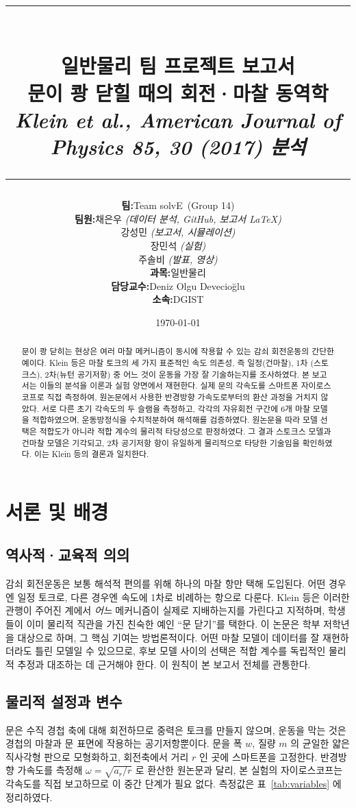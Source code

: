 \documentclass[11pt,letterpaper]{article}
\title{\vspace{-1.5in}
\rule{\linewidth}{1.5pt} \\ \vspace{4mm}
\large\textbf{일반물리 팀 프로젝트 보고서} \\ \vspace{2mm}
\Large\textbf{문이 쾅 닫힐 때의 회전·마찰 동역학}
\\ \vspace{4mm}
\large\textit{Klein et al., American Journal of Physics 85, 30 (2017) 분석} \\
\rule{\linewidth}{1.5pt}}
\author{
\begin{tabular}{r @{\quad} l}
\textbf{팀:} & Team solvE \,(Group 14) \\[1ex]
\textbf{팀원:} & 채은우 \textit{(데이터 분석, GitHub, 보고서 \LaTeX)} \\
 & 강성민 \textit{(보고서, 시뮬레이션)} \\
 & 장민석 \textit{(실험)} \\
 & 주솔비 \textit{(발표, 영상)} \\[1ex]
\textbf{과목:}  & 일반물리 \\
\textbf{담당교수:}    & Deniz Olgu Devecio\u{g}lu \\
\textbf{소속:}    & DGIST
\end{tabular}}
\date{\today}
\begin{document}
\maketitle
\begin{abstract}
문이 쾅 닫히는 현상은 여러 마찰 메커니즘이 동시에 작용할 수 있는 감쇠 회전운동의 간단한
예이다. Klein 등은 마찰 토크의 세 가지 표준적인 속도 의존성, 즉 일정(건마찰), 1차
(스토크스), 2차(뉴턴 공기저항) 중 어느 것이 운동을 가장 잘 기술하는지를 조사하였다. 본
보고서는 이들의 분석을 이론과 실험 양면에서 재현한다. 실제 문의 각속도를 스마트폰
자이로스코프로 직접 측정하여, 원논문에서 사용한 반경방향 가속도로부터의 환산 과정을 거치지
않았다. 서로 다른 초기 각속도의 두 슬램을 측정하고, 각각의 자유회전 구간에 6개 마찰 모델을
적합하였으며, 운동방정식을 수치적분하여 해석해를 검증하였다. 원논문을 따라 모델 선택은
적합도가 아니라 적합 계수의 물리적 타당성으로 판정하였다. 그 결과 스토크스 모델과 건마찰
모델은 기각되고, 2차 공기저항 항이 유일하게 물리적으로 타당한 기술임을 확인하였다. 이는
Klein 등의 결론과 일치한다.
\end{abstract}
\newpage
\tableofcontents
\newpage

\section{서론 및 배경}
\subsection{역사적·교육적 의의}
감쇠 회전운동은 보통 해석적 편의를 위해 하나의 마찰 항만 택해 도입된다. 어떤 경우엔 일정
토크로, 다른 경우엔 속도에 1차로 비례하는 항으로 다룬다. Klein 등은 이러한 관행이 주어진
계에서 \emph{어느} 메커니즘이 실제로 지배하는지를 가린다고 지적하며, 학생들이 이미 물리적
직관을 가진 친숙한 예인 ``문 닫기''를 택한다. 이 논문은 학부 저학년을 대상으로 하며, 그
핵심 기여는 방법론적이다. 어떤 마찰 모델이 데이터를 잘 재현하더라도 틀린 모델일 수 있으므로,
후보 모델 사이의 선택은 적합 계수를 독립적인 물리적 추정과 대조하는 데 근거해야 한다. 이
원칙이 본 보고서 전체를 관통한다.

\subsection{물리적 설정과 변수}
문은 수직 경첩 축에 대해 회전하므로 중력은 토크를 만들지 않으며, 운동을 막는 것은 경첩의
마찰과 문 표면에 작용하는 공기저항뿐이다. 문을 폭 $w$, 질량 $m$ 의 균일한 얇은 직사각형
판으로 모형화하고, 회전축에서 거리 $r$ 인 곳에 스마트폰을 고정한다. 반경방향 가속도를
측정해 $\omega=\sqrt{a_r/r}$ 로 환산한 원논문과 달리, 본 실험의 자이로스코프는 각속도를
직접 보고하므로 이 중간 단계가 필요 없다. 측정값은 표~\ref{tab:variables} 에 정리하였다.
\end{document}
